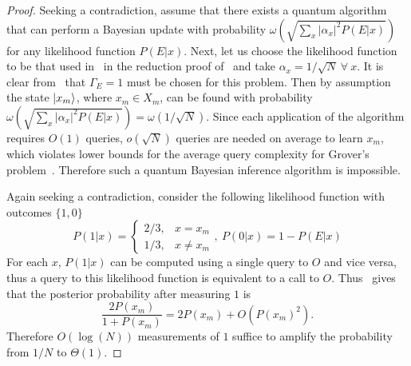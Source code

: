 \documentclass[aps,amsmath,onecolumn,amssymb]{revtex4}
\begin{document}
\begin{proof}
Seeking a contradiction, assume that there exists a quantum algorithm that can perform a Bayesian update with probability $\omega(\sqrt{\sum_x |\alpha_x|^2 P(E|x)})$ for any likelihood function $P(E|x)$.  Next, let us choose the likelihood function to be that used in~ in the reduction proof of~ and take $\alpha_x =1/\sqrt{N}~\forall~x$.  It is clear from~ that $\Gamma_E =1$ must be chosen for this problem.  Then by assumption the state $\left|x_m\right\rangle$, where $x_m \in X_m$, can be found with probability $\omega(\sqrt{\sum_x |\alpha_x|^2 P(E|x)})= \omega(1/\sqrt{N})$.  Since each application of the algorithm requires $O(1)$ queries, $o(\sqrt{N})$ queries are needed on average to learn $x_m$, which violates lower bounds for the average query complexity for Grover's problem~\cite{BGH+96}.  Therefore such a quantum Bayesian inference algorithm is impossible.


Again seeking a contradiction, consider the following likelihood function with outcomes $\{1,0\}$
\begin{equation}
P(1|x) = \begin{cases}
2/3, & x=x_m \\
1/3, & x\ne x_m
\end{cases},~P({0}|x) = 1-P(E|x)\label{eq:bayesgrover}
\end{equation}
For each $x$, $P(1|x)$ can be computed using a single query to $O$ and vice versa, thus a query to this likelihood function is equivalent to a call to $O$.
Thus~ gives that the posterior probability after measuring $1$ is
\begin{equation}
\frac{2P(x_m)}{1 + P(x_m)}=2P(x_m) + O(P(x_m)^2).
\end{equation}
Therefore $O(\log(N))$ measurements of $1$ suffice to amplify the probability from $1/N$ to $\Theta(1)$.  


\end{proof}
\end{document}
